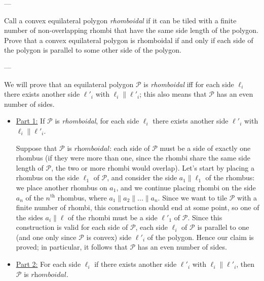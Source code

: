 
---

Call a convex equilateral polygon \emph{rhomboidal} if it can be tiled with a finite number of non-overlapping rhombi that have the same side length of the polygon. Prove that a convex equilateral polygon is rhomboidal if and only if each side of the polygon is parallel to some other side of the polygon. 

---

We will prove that an equilateral polygon $\mathcal{P}$ is \textit{rhomboidal} iff for each side $\ell_i$ there exists another side $\ell'_i$ with $\ell_i \parallel \ell'_i$; this also means that $\mathcal{P}$ has an even number of sides.

\begin{itemize}
    \item\underline{Part 1:} If $\mathcal{P}$ is \textit{rhomboidal}, for each side $\ell_i$ there exists another side $\ell'_i$ with $\ell_i \parallel \ell'_i$.

        Suppose that $\mathcal{P}$ is $\textit{rhomboidal}$: each side of $\mathcal{P}$ must be a side of exactly one rhombus (if they were more than one, since the rhombi share the same side length of $\mathcal{P}$, the two or more rhombi would overlap). Let's start by placing a rhombus on the side $\ell_1$ of $\mathcal{P}$, and consider the side $a_1\parallel \ell_1$ of the rhombus: we place another rhombus on $a_1$, and we continue placing rhombi on the side $a_{n}$ of the $n^{\text{th}}$ rhombus, where $a_1\parallel a_2\parallel ...\parallel a_n$. Since we want to tile $\mathcal{P}$ with a finite number of rhombi, this construction should end at some point, so one of the sides $a_i\parallel \ell$ of the rhombi must be a side $\ell'_1$ of $\mathcal{P}$. Since this construction is valid for each side of $\mathcal{P}$, each side $\ell_i$ of $\mathcal{P}$ is parallel to one (and one only since $\mathcal{P}$ is convex) side $\ell'_i$ of the polygon. Hence our claim is proved; in particular, it follows that $\mathcal{P}$ has an even number of sides.

    \item\underline{Part 2:} For each side $\ell_i$ if  there exists another side $\ell'_i$ with $\ell_i \parallel \ell'_i$, then $\mathcal{P}$ is $\textit{rhomboidal}$.


\end{itemize}
